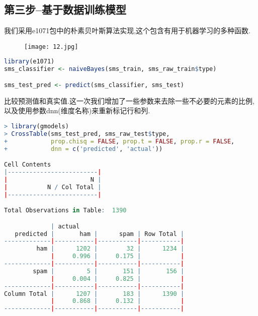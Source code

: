 \documentclass[11pt,a4paper,oneside]{book}
\begin{document}
\subsection{第三步--基于数据训练模型}
我们采用e1071包中的朴素贝叶斯算法实现,这个包含有用于机器学习的多种函数.
\begin{figure}[H]
	\centering
	\texttt{[image: 12.jpg]}
\end{figure}
\begin{lstlisting}[language=r]
library(e1071)
sms_classifier <- naiveBayes(sms_train, sms_raw_train$type)

sms_test_pred <- predict(sms_classifier, sms_test)
\end{lstlisting}
比较预测值和真实值.这一次我们增加了一些参数来去除一些不必要的元素的比例,以及使用参数dnn(维度名称)来重新标记行和列.
\begin{lstlisting}[language=r]
> library(gmodels)
> CrossTable(sms_test_pred, sms_raw_test$type,
+            prop.chisq = FALSE, prop.t = FALSE, prop.r = FALSE,
+            dnn = c('predicted', 'actual'))

Cell Contents
|-------------------------|
|                       N |
|           N / Col Total |
|-------------------------|

Total Observations in Table:  1390 

             | actual 
   predicted |       ham |      spam | Row Total | 
-------------|-----------|-----------|-----------|
         ham |      1202 |        32 |      1234 | 
             |     0.996 |     0.175 |           | 
-------------|-----------|-----------|-----------|
        spam |         5 |       151 |       156 | 
             |     0.004 |     0.825 |           | 
-------------|-----------|-----------|-----------|
Column Total |      1207 |       183 |      1390 | 
             |     0.868 |     0.132 |           | 
-------------|-----------|-----------|-----------|
\end{lstlisting}
\end{document}
